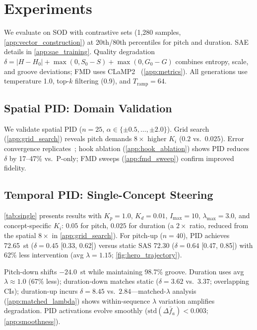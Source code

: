 \documentclass{article}
\theoremstyle{plain}
\begin{document}
\section{Experiments}
\label{sec:experiments}

We evaluate on SOD with contrastive sets (1,280 samples, \cref{app:vector_construction}) at 20th/80th percentiles for pitch and duration. SAE details in \cref{app:sae_training}. Quality degradation $\delta = |H - H_0| + \max(0, S_0 - S) + \max(0, G_0 - G)$ combines entropy, scale, and groove deviations; FMD uses CLaMP2~\cite{wu2024clamp2} (\cref{app:metrics}). All generations use temperature 1.0, top-$k$ filtering (0.9), and $T_\text{ramp}{=}64$.

\subsection{Spatial PID: Domain Validation}
\label{sec:spatial_results}

We validate spatial PID ($n{=}25$, $\alpha \in \{\pm 0.5, \ldots, \pm 2.0\}$). Grid search (\cref{app:grid_search}) reveals pitch demands $8{\times}$ higher $K_i$ ($0.2$ vs.\ $0.025$). Error convergence replicates~\citet{nguyen2026pid}; hook ablation (\cref{app:hook_ablation}) shows PID reduces $\delta$ by 17--47\% vs.\ P-only; FMD sweeps (\cref{app:fmd_sweep}) confirm improved fidelity.


\subsection{Temporal PID: Single-Concept Steering}
\label{sec:single}

\cref{tab:single} presents results with $K_p{=}1.0$, $K_d{=}0.01$, $I_\text{max}{=}10$, $\lambda_\text{max}{=}3.0$, and concept-specific $K_i$: $0.05$ for pitch, $0.025$ for duration (a $2{\times}$ ratio, reduced from the spatial $8{\times}$ in \cref{app:grid_search}). For pitch-up ($n{=}40$), PID achieves 72.65~st ($\delta{=}0.45$ [0.33, 0.62]) versus static SAS 72.30 ($\delta{=}0.64$ [0.47, 0.85]) with 62\% less intervention (avg $\lambda{=}1.15$; \cref{fig:hero_trajectory}).

Pitch-down shifts $-24.0$~st while maintaining 98.7\% groove. Duration uses avg $\lambda{\approx}1.0$ (67\% less); duration-down matches static ($\delta{=}3.62$ vs.\ $3.37$; overlapping CIs); duration-up incurs $\delta{=}8.45$ vs.\ $2.84$---matched-$\lambda$ analysis (\cref{app:matched_lambda}) shows within-sequence $\lambda$ variation amplifies degradation. PID activations evolve smoothly ($\text{std}(\Delta \bar{f}_a) < 0.003$; \cref{app:smoothness}).
\end{document}
